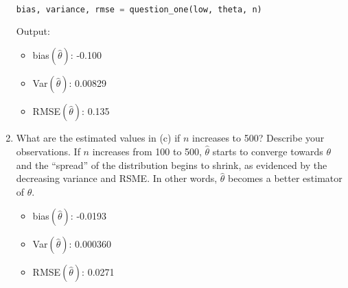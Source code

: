\documentclass{article}
\begin{document}
\begin{enumerate}[label={(\alph*)}]
\begin{lstlisting}[language=Python, caption=Code for part (c)]
bias, variance, rmse = question_one(low, theta, n)
\end{lstlisting}

Output:
    \begin{itemize}
        \item bias$(\hat{\theta})$: -0.100
        \item Var$(\hat{\theta})$: 0.00829
        \item RMSE$(\hat{\theta})$: 0.135
    \end{itemize}
    
    \item What are the estimated values in (c) if $n$ increases to 500? Describe your observations.
    If $n$ increases from 100 to 500, $\hat{\theta}$ starts to converge towards $\theta$ and the ``spread'' of the distribution begins to shrink, as evidenced by the decreasing variance and RSME. In other words, $\hat{\theta}$ becomes a better estimator of $\theta$.
    \begin{itemize}
        \item bias$(\hat{\theta})$: -0.0193
        \item Var$(\hat{\theta})$: 0.000360
        \item RMSE$(\hat{\theta})$: 0.0271
    \end{itemize}
\end{enumerate}
\pagebreak
\end{document}
